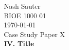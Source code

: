 \documentclass[12pt]{article}
\begin{document}
\noindent Nash Sauter \\
\noindent BIOE 1000 01 \\
\noindent \today \\
\noindent Case Study Paper X \\
\noindent \textbf{IV\@. Title}

\Blindtext{}
\end{document}
